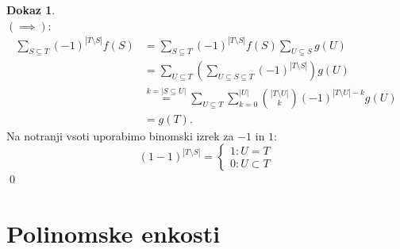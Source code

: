 \documentclass[a4paper, 12pt]{book}
\theoremstyle{definition}
\newtheorem{pro}[counter]{Dokaz}
\theoremstyle{remark}
\begin{document}
\begin{pro} \text{} \\
  $(\implies)$:
  \begin{align*}
    \sum_{S \subseteq T} (-1)^{|T \setminus S|} f(S) &= \sum_{S \subseteq T} (-1)^{|T \setminus S|} f(S) \sum_{U \subseteq S} g(U) \\
    &= \sum_{U \subseteq T} \left(\sum_{U \subseteq S \subseteq T} (-1)^{|T \setminus S|}\right) g(U) \\
    &\stackrel{k=|S \subseteq U|}{=} \sum_{U \subseteq T}
      \sum_{k=0}^{|U|} \binom{|T \setminus U|}{k} (-1)^{|T \setminus U| - k} g(U) \\
    &= g(T).
  \end{align*}
  Na notranji vsoti uporabimo binomski izrek za $-1$ in $1:$
  \begin{equation*}
    (1-1)^{|T \setminus S|} =
    \begin{cases}
      1: U = T \\
      0: U \subset T
    \end{cases}
  \end{equation*}
  \qed
\end{pro}


\section{Polinomske enkosti}
\end{document}
